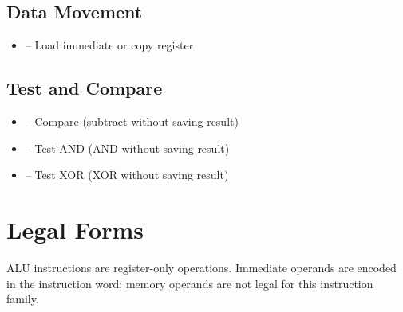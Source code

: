\subsection{Data Movement}
\begin{itemize}
	\item {} -- Load immediate or copy register
\end{itemize}

\subsection{Test and Compare}
\begin{itemize}
	\item {} -- Compare (subtract without saving result)
	\item {} -- Test AND (AND without saving result)
	\item {} -- Test XOR (XOR without saving result)
\end{itemize}

\section{Legal Forms}

ALU instructions are register-only operations. Immediate operands are encoded in the instruction word; memory operands
are not legal for this instruction family.

